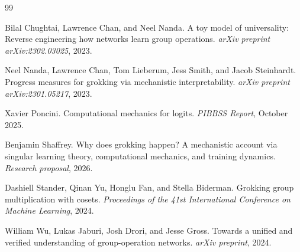 \documentclass[11pt,a4paper]{article}
\begin{document}
\begin{thebibliography}{99}

Bilal Chughtai, Lawrence Chan, and Neel Nanda.
\newblock A toy model of universality: Reverse engineering how networks learn group operations.
\newblock \emph{arXiv preprint arXiv:2302.03025}, 2023.

Neel Nanda, Lawrence Chan, Tom Lieberum, Jess Smith, and Jacob Steinhardt.
\newblock Progress measures for grokking via mechanistic interpretability.
\newblock \emph{arXiv preprint arXiv:2301.05217}, 2023.

Xavier Poncini.
\newblock Computational mechanics for logits.
\newblock \emph{PIBBSS Report}, October 2025.

Benjamin Shaffrey.
\newblock Why does grokking happen? A mechanistic account via singular learning theory, computational mechanics, and training dynamics.
\newblock \emph{Research proposal}, 2026.

Dashiell Stander, Qinan Yu, Honglu Fan, and Stella Biderman.
\newblock Grokking group multiplication with cosets.
\newblock \emph{Proceedings of the 41st International Conference on Machine Learning}, 2024.

William Wu, Lukas Jaburi, Josh Drori, and Jesse Gross.
\newblock Towards a unified and verified understanding of group-operation networks.
\newblock \emph{arXiv preprint}, 2024.

\end{thebibliography}
\end{document}
